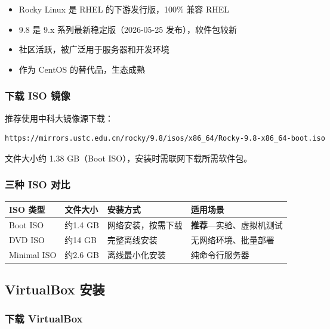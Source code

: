\documentclass[12pt,a4paper]{ctexart}
\begin{document}
\begin{itemize}
  \item Rocky Linux 是 RHEL 的下游发行版，100\% 兼容 RHEL
  \item 9.8 是 9.x 系列最新稳定版（2026-05-25 发布），软件包较新
  \item 社区活跃，被广泛用于服务器和开发环境
  \item 作为 CentOS 的替代品，生态成熟
\end{itemize}

\subsubsection{下载 ISO 镜像}

推荐使用中科大镜像源下载：

\begin{cmdbox}
\small
\begin{lstlisting}[language=bash,numbers=none]
https://mirrors.ustc.edu.cn/rocky/9.8/isos/x86_64/Rocky-9.8-x86_64-boot.iso
\end{lstlisting}
\end{cmdbox}

文件大小约 1.38 GB（Boot ISO），安装时需联网下载所需软件包。

\subsubsection{三种 ISO 对比}

\begin{table}[h]
\centering
\begin{tabular}{p{2cm}p{2.5cm}p{3cm}p{5cm}}
\toprule
ISO 类型 & 文件大小 & 安装方式 & 适用场景 \\
\midrule
Boot ISO  & 约1.4 GB & 网络安装，按需下载 & \textbf{推荐}—实验、虚拟机测试 \\
DVD ISO   & 约14 GB  & 完整离线安装    & 无网络环境、批量部署 \\
Minimal ISO & 约2.6 GB & 离线最小化安装  & 纯命令行服务器 \\
\bottomrule
\end{tabular}
\end{table}

\subsection{VirtualBox 安装}

\subsubsection{下载 VirtualBox}
\end{document}
